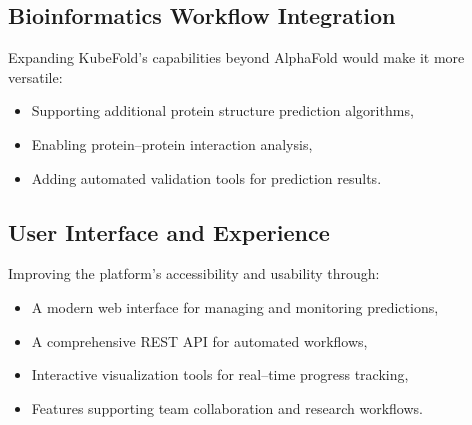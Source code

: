 \subsection{Bioinformatics Workflow Integration}
Expanding KubeFold's capabilities beyond AlphaFold would make it more versatile:
\begin{itemize}
    \item Supporting additional protein structure prediction algorithms,
    \item Enabling protein--protein interaction analysis,
    \item Adding automated validation tools for prediction results.
\end{itemize}

\subsection{User Interface and Experience}
Improving the platform's accessibility and usability through:
\begin{itemize}
    \item A modern web interface for managing and monitoring predictions,
    \item A comprehensive REST API for automated workflows,
    \item Interactive visualization tools for real--time progress tracking,
    \item Features supporting team collaboration and research workflows.
\end{itemize}
%
%
%
%
